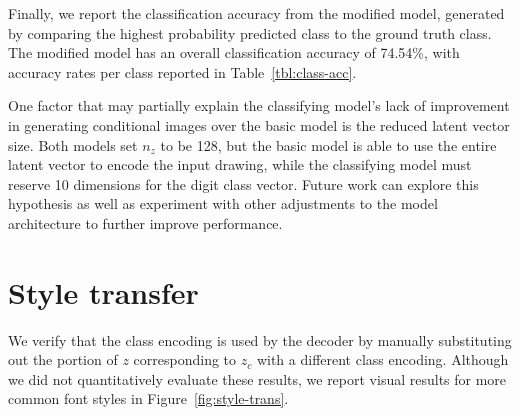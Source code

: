 Finally, we report the classification accuracy from the modified model, generated by comparing the highest probability predicted class to the ground truth class.
The modified model has an overall classification accuracy of 74.54\%, with accuracy rates per class reported in Table~\ref{tbl:class-acc}.

One factor that may partially explain the classifying model's lack of improvement in generating conditional images over the basic model is the reduced latent vector size.
Both models set $n_z$ to be 128, but the basic model is able to use the entire latent vector to encode the input drawing, while the classifying model must reserve 10 dimensions for the digit class vector.
Future work can explore this hypothesis as well as experiment with other adjustments to the model architecture to further improve performance.

\section{Style transfer}
We verify that the class encoding is used by the decoder by manually substituting out the portion of $z$ corresponding to $z_c$ with a different class encoding.
Although we did not quantitatively evaluate these results, we report visual results for more common font styles in Figure~\ref{fig:style-trans}. 


